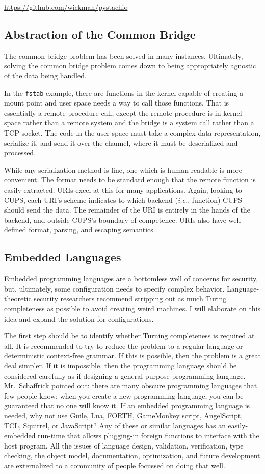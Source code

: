 \documentclass[letterpaper,twocolumn,10pt]{article}
\begin{document}
\noindent \url{https://github.com/wickman/pystachio}

\subsection{Abstraction of the Common Bridge}
The common bridge problem has been solved in many instances. Ultimately, solving the common bridge problem comes down to being appropriately agnostic of the data being handled.

In the \texttt{fstab} example, there are functions in the kernel capable of creating a mount point and user space needs a way to call those functions. That is essentially a remote procedure call, except the remote procedure is in kernel space rather than a remote system and the bridge is a system call rather than a TCP socket. The code in the user space must take a complex data representation, serialize it, and send it over the channel, where it must be deserialized and processed.

While any serialization method is fine, one which is human readable is more convenient. The format needs to be standard enough that the remote function is easily extracted. URIs excel at this for many applications. Again, looking to CUPS, each URI's scheme indicates to which backend (\emph{i.e.}, function) CUPS should send the data. The remainder of the URI is entirely in the hands of the backend, and outside CUPS's boundary of competence. URIs also have well-defined format, parsing, and escaping semantics.

\subsection{Embedded Languages}
Embedded programming languages are a bottomless well of concerns for security, but, ultimately, some configuration needs to specify complex behavior. Language-theoretic security researchers recommend stripping out as much Turing completeness as possible to avoid creating weird machines. I will elaborate on this idea and expand the solution for configurations.

The first step should be to identify whether Turning completeness is required at all. It is recommended to try to reduce the problem to a regular language or deterministic context-free grammar. If this is possible, then the problem is a great deal simpler. If it is impossible, then the programming language should be considered carefully as if designing a general purpose programming language. Mr.~Schaffrick pointed out: there are many obscure programming languages that few people know; when you create a new programming language, you can be guaranteed that no one will know it. If an embedded programming language is needed, why not use Guile, Lua, FORTH, GameMonkey script, AngelScript, TCL, Squirrel, or JavaScript? Any of these or similar languages has an easily-embedded run-time that allows plugging-in foreign functions to interface with the host program. All the issues of language design, validation, verification, type checking, the object model, documentation, optimization, and future development are externalized to a community of people focussed on doing that well.
\end{document}
